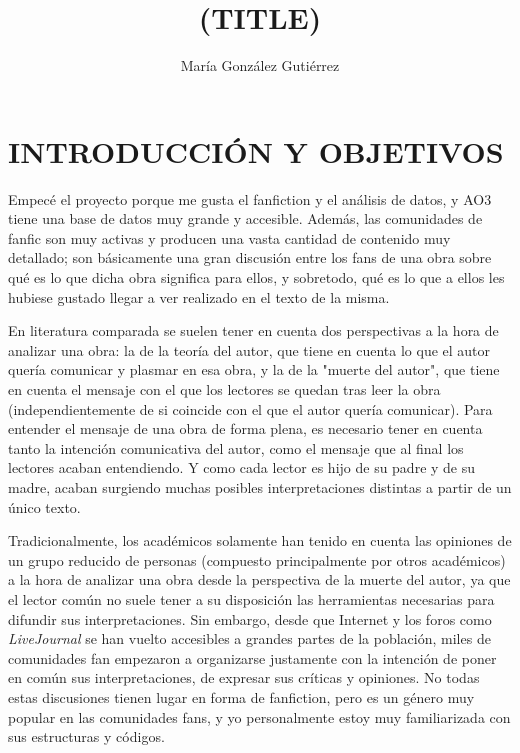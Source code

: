 \documentclass{pre-tfg}
\title{(TITLE)}
\author{María González Gutiérrez}
\begin{document}
\maketitle
\tableofcontents

\newpage


\section{INTRODUCCIÓN Y OBJETIVOS}

Empecé el proyecto porque me gusta el fanfiction y el análisis de datos, y AO3 tiene una base de datos muy grande  y accesible. Además, las comunidades de fanfic son muy activas y producen una vasta cantidad de contenido muy detallado; son básicamente una gran discusión entre los fans de una obra sobre qué es lo que dicha obra significa para ellos, y sobretodo, qué es lo que a ellos les hubiese gustado llegar a ver realizado en el texto de la misma.

En literatura comparada se suelen tener en cuenta dos perspectivas a la hora de analizar una obra: la de la teoría del autor, que tiene en cuenta lo que el autor quería comunicar y plasmar en esa obra, y la de la "muerte del autor"\cite{Barthes}, que tiene en cuenta el mensaje con el que los lectores se quedan tras leer la obra (independientemente de si coincide con el que el autor quería comunicar).
Para entender el mensaje de una obra de forma plena, es necesario tener en cuenta tanto la intención comunicativa del autor, como el mensaje que al final los lectores acaban entendiendo. Y como cada lector es hijo de su padre y de su madre, acaban surgiendo muchas posibles interpretaciones distintas a partir de un único texto.

Tradicionalmente, los académicos solamente han tenido en cuenta las opiniones de un grupo reducido de personas (compuesto principalmente por otros académicos) a la hora de analizar una obra desde la perspectiva de la muerte del autor, ya que el lector común no suele tener a su disposición las herramientas necesarias para difundir sus interpretaciones. Sin embargo, desde que Internet y los foros como \textit{LiveJournal} se han vuelto accesibles a grandes partes de la población, miles de comunidades fan empezaron a organizarse justamente con la intención de poner en común sus interpretaciones, de expresar sus críticas y opiniones. No todas estas discusiones tienen lugar en forma de fanfiction, pero es un género muy popular en las comunidades fans, y yo personalmente estoy muy familiarizada con sus estructuras y códigos.
\end{document}
